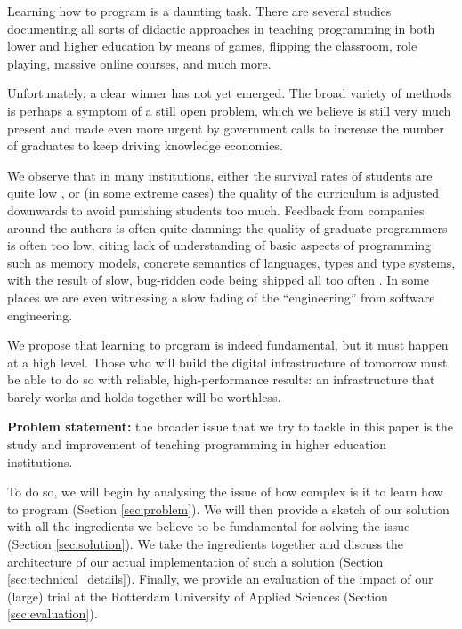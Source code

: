 Learning how to program is a daunting task. There are several studies \cite{fenichel1970program,fincher99,govender2006learning,jenkins2002difficulty,matthiasdottir2006teach,mulholland1998using} documenting all sorts of didactic approaches in teaching programming in both lower and higher education by means of games, flipping the classroom, role playing, massive online courses, and much more.

Unfortunately, a clear winner has not yet emerged. The broad variety of methods is perhaps a symptom of a still open problem, which we believe is still very much present and made even more urgent by government calls to increase the number of graduates \cite{graduates} to keep driving knowledge economies. 

We observe that in many institutions, either the survival rates of students are quite low \cite{bergin2005influence}, or (in some extreme cases) the quality of the curriculum is adjusted downwards to avoid punishing students too much. Feedback from companies around the authors is often quite damning: the quality of graduate programmers is often too low, citing lack of understanding of basic aspects of programming such as memory models, concrete semantics of languages, types and type systems, with the result of slow, bug-ridden code being shipped all too often \cite{pattern_insight,guardian2006}. In some places we are even witnessing a slow fading of the ``engineering'' from software engineering.

We propose that learning to program is indeed fundamental, but it must happen at a high level. Those who will build the digital infrastructure of tomorrow must be able to do so with reliable, high-performance results: an infrastructure that barely works and holds together will be worthless.

\textbf{Problem statement:} the broader issue that we try to tackle in this paper is the study and improvement of teaching programming in higher education institutions. 

To do so, we will begin by analysing the issue of how complex is it to learn how to program (Section \ref{sec:problem}). We will then provide a sketch of our solution with all the ingredients we believe to be fundamental for solving the issue (Section \ref{sec:solution}). We take the ingredients together and discuss the architecture of our actual implementation of such a solution (Section \ref{sec:technical_details}). Finally, we provide an evaluation of the impact of our (large) trial at the Rotterdam University of Applied Sciences (Section \ref{sec:evaluation}).
